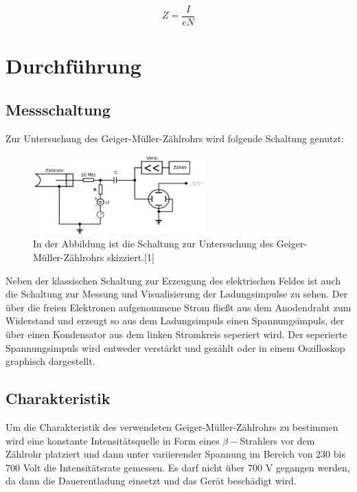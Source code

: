 \documentclass[titlepage = firstcover]{scrartcl}
\begin{document}
            \begin{equation}
                Z =  \frac{I}{eN}
                \label{eqn:Ladung}
            \end{equation}
        
    \section{Durchführung}
        \subsection{Messschaltung}
            Zur Untersuchung des Geiger-Müller-Zählrohrs wird folgende Schaltung genutzt:

            \FloatBarrier

                \begin{figure}[h]
                  \centering
                  \includegraphics[width = 0.6\textwidth]{Bilder/Messaufbau.png}
                  \caption{In der Abbildung ist die Schaltung zur Untersuchung des Geiger-Müller-Zählrohrs skizziert.[1]}
                  \label{fig:Messaufbau}
                \end{figure}

            \FloatBarrier
            \noindent
            Neben der klassischen Schaltung zur Erzeugung des elektrischen Feldes ist auch die Schaltung zur Messung und Visualisierung der Ladungsimpulse zu sehen. Der über die freien Elektronen
            aufgenommene Strom fließt aus dem Anodendraht zum Widerstand und erzeugt so aus dem Ladungsimpuls einen Spannungsimpuls, der über einen Kondensator aus dem linken Stromkreis seperiert wird.
            Der seperierte Spannungsimpuls wird entweder verstärkt und gezählt oder in einem Oszilloskop graphisch dargestellt.

        \subsection{Charakteristik}
            Um die Charakteristik des verwendeten Geiger-Müller-Zählrohrs zu bestimmen wird eine konstante Intensitätsquelle in Form eines $\beta-$Strahlers vor dem Zählrohr platziert und dann unter 
            variierender Spannung im Bereich von 230 bis 700 Volt die Intensitätsrate gemessen. Es darf nicht über 700 V gegangen werden, da dann die Dauerentladung einsetzt und das Gerät beschädigt
            wird.
\end{document}

